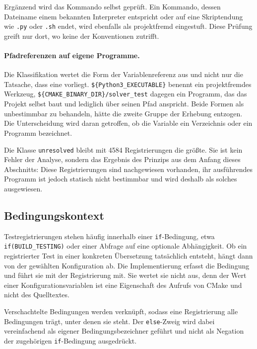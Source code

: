 \documentclass[12pt,a4paper,twoside,headsepline,parskip=half]{scrreprt}
\begin{document}
Ergänzend wird das Kommando selbst geprüft. Ein Kommando, dessen Dateiname einem
bekannten Interpreter entspricht oder auf eine Skriptendung wie \texttt{.py} oder
\texttt{.sh} endet, wird ebenfalls als projektfremd eingestuft. Diese Prüfung greift
nur dort, wo keine der Konventionen zutrifft.

\paragraph{Pfadreferenzen auf eigene Programme.}
Die Klassifikation wertet die Form der Variablenreferenz aus und nicht nur die
Tatsache, dass eine vorliegt. \texttt{\$\{Python3\discretionary{}{}{}\_EXECUTABLE\}} benennt ein
projektfremdes Werkzeug, \texttt{\$\{CMAKE\discretionary{}{}{}\_BINARY\discretionary{}{}{}\_DIR\}/solver\discretionary{}{}{}\_test} dagegen ein
Programm, das das Projekt selbst baut und lediglich über seinen Pfad anspricht. Beide
Formen als unbestimmbar zu behandeln, hätte die zweite Gruppe der Erhebung entzogen.
Die Unterscheidung wird daran getroffen, ob die Variable ein Verzeichnis oder ein
Programm bezeichnet.

Die Klasse \texttt{unresolved} bleibt mit 4584 Registrierungen die größte. Sie ist
kein Fehler der Analyse, sondern das Ergebnis des Prinzips aus dem Anfang dieses
Abschnitts: Diese Registrierungen sind nachgewiesen vorhanden, ihr ausführendes
Programm ist jedoch statisch nicht bestimmbar und wird deshalb als solches
ausgewiesen.

\subsection{Bedingungskontext}
\label{sec:impl-bedingungen}

Testregistrierungen stehen häufig innerhalb einer \texttt{if}-Bedingung, etwa
\texttt{if(BUILD\discretionary{}{}{}\_TESTING)} oder einer Abfrage auf eine optionale Abhängigkeit. Ob ein
registrierter Test in einer konkreten Übersetzung tatsächlich entsteht, hängt dann von
der gewählten Konfiguration ab. Die Implementierung erfasst die Bedingung und führt sie
mit der Registrierung mit. Sie wertet sie nicht aus, denn der Wert einer
Konfigurationsvariablen ist eine Eigenschaft des Aufrufs von CMake und nicht des
Quelltextes.

Verschachtelte Bedingungen werden verknüpft, sodass eine Registrierung alle
Bedingungen trägt, unter denen sie steht. Der \texttt{else}-Zweig wird dabei
vereinfachend als eigener Bedingungsbezeichner geführt und nicht als Negation der
zugehörigen \texttt{if}-Bedingung ausgedrückt.
\end{document}
